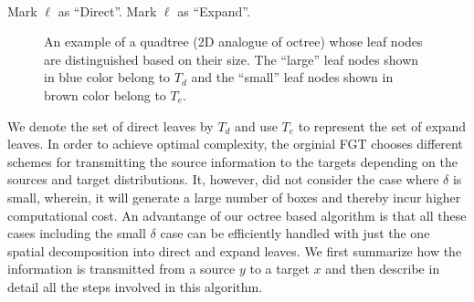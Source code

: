 {\tt
\begin{algorithmic}
\STATE
          \STATE Mark $\ell$ as ``Direct''. 
      \ELSE
          \STATE Mark $\ell$ as ``Expand''. 
      \ENDIF
  \ENDFOR
\STATE
\end{algorithmic}
}

\begin{figure}
\begin{center}
\caption{\label{f:directExpand} An example of a quadtree (2D analogue of octree) whose leaf nodes are distinguished based 
on their size. The ``large'' leaf nodes shown in blue color belong to $T_d$ and 
the ``small'' leaf nodes shown in brown color belong to $T_e$.}  
\end{center}
\end{figure}

We denote the set of direct leaves by $T_d$ and use $T_e$ to represent the set of expand leaves. In order to achieve optimal complexity, the 
orginial FGT \cite{fgt} chooses different schemes for transmitting the source information to the targets 
depending on the sources and target distributions. It, however, did not consider the case where $\delta$ is small, wherein, it will generate a
large number of boxes and thereby incur higher computational cost. An advantange of our octree based algorithm is that all these cases including 
the small $\delta$ case can be efficiently handled with just the one spatial decomposition into direct and expand leaves. We first summarize 
how the information is transmitted from a source $y$ to a target $x$ and then describe in detail all the steps involved in this algorithm.

